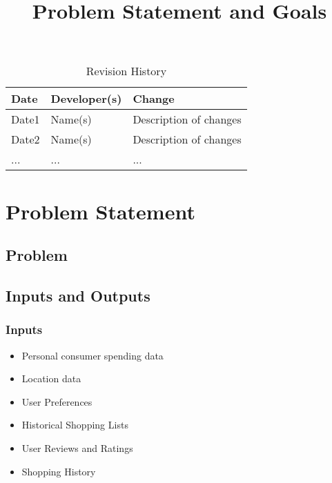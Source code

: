\documentclass{article}
\title{Problem Statement and Goals\\\progname}
\author{\authname}
\date{}
\begin{document}
\maketitle

\begin{table}[hp]
\caption{Revision History} \label{TblRevisionHistory}
\begin{tabularx}{\textwidth}{llX}
\toprule
\textbf{Date} & \textbf{Developer(s)} & \textbf{Change}\\
\midrule
Date1 & Name(s) & Description of changes\\
Date2 & Name(s) & Description of changes\\
... & ... & ...\\
\bottomrule
\end{tabularx}
\end{table}

\section{Problem Statement}


\subsection{Problem}

\subsection{Inputs and Outputs}

\subsubsection{Inputs}
    \begin{itemize}
        \item Personal consumer spending data
        \item Location data
        \item User Preferences
        \item Historical Shopping Lists
        \item User Reviews and Ratings
        \item Shopping History
    \end{itemize}
\end{document}
